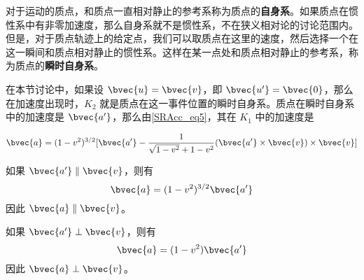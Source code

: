 对于运动的质点，和质点一直相对静止的参考系称为质点的\textbf{自身系}。如果质点在惯性系中有非零加速度，那么自身系就不是惯性系，不在狭义相对论的讨论范围内。但是，对于质点轨迹上的给定点，我们可以取质点在这里的速度，然后选择一个在这一瞬间和质点相对静止的惯性系。这样在某一点处和质点相对静止的参考系，称为质点的\textbf{瞬时自身系}。

在本节讨论中，如果设 $\bvec{u}=\bvec{v}$，即 $\bvec{u'}=\bvec{0}$，那么在加速度出现时，$K_2$ 就是质点在这一事件位置的瞬时自身系。质点在瞬时自身系中的加速度是 $\bvec{a'}$，那么由\autoref{SRAcc_eq5}，其在 $K_1$ 中的加速度是

\begin{equation}
\bvec{a}=(1-v^2)^{3/2}[\bvec{a'}-\frac{1}{\sqrt{1-v^2}+1-v^2}(\bvec{a'}\times\bvec{v})\times\bvec{v}]
\end{equation}

如果 $\bvec{a'}\parallel \bvec{v}$，则有
\begin{equation}
\bvec{a}=(1-v^2)^{3/2}\bvec{a'}
\end{equation}
因此 $\bvec{a}\parallel\bvec{v}$。

如果 $\bvec{a'}\perp \bvec{v}$，则有
\begin{equation}
\bvec{a}=(1-v^2)\bvec{a'}
\end{equation}
因此 $\bvec{a}\perp\bvec{v}$。


